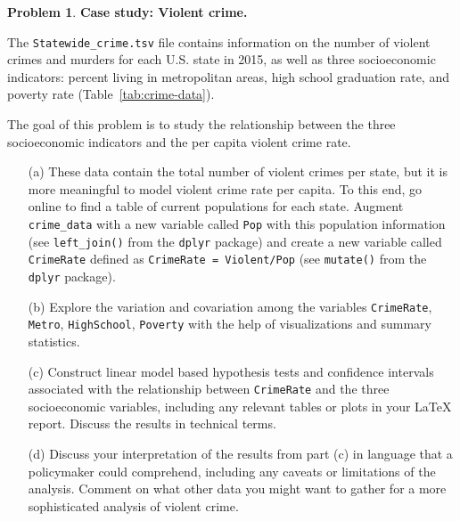 \documentclass[11pt,letterpaper,english,oneside]{article} %
\theoremstyle{definition} %
\newtheorem{problem}{Problem}
\newenvironment{prob}{\clearpage \begin{problem}\hspace{0pt}}{\end{problem}}
\begin{document}
    
    \begin{prob} \label{prob:data}\textbf{Case study: Violent crime.}
    
    \noindent The \texttt{Statewide\_crime.tsv} file contains information on the number of violent crimes and murders for each U.S. state in 2015, as well as three socioeconomic indicators: percent living in metropolitan areas, high school graduation rate, and poverty rate (Table~\ref{tab:crime-data}).

    

    \noindent The goal of this problem is to study the relationship between the three socioeconomic indicators and the per capita violent crime rate.
    
    \begin{itemize}
    \item[(a)] These data contain the total number of violent crimes per state, but it is more meaningful to model violent crime rate per capita. To this end, go online to find a table of current populations for each state. Augment \verb|crime_data| with a new variable called \verb|Pop| with this population information (see \verb|left_join()| from the \verb|dplyr| package) and create a new variable called \verb|CrimeRate| defined as \verb|CrimeRate = Violent/Pop| (see \verb|mutate()| from the \verb|dplyr| package).
    
    \item[(b)] Explore the variation and covariation among the variables \verb|CrimeRate|, \verb|Metro|, \verb|HighSchool|, \verb|Poverty| with the help of visualizations and summary statistics.
    
    \item[(c)] Construct linear model based hypothesis tests and confidence intervals associated with the relationship between \verb|CrimeRate| and the three socioeconomic variables, including any relevant tables or plots in your LaTeX report. Discuss the results in technical terms.
    
    \item[(d)] Discuss your interpretation of the results from part (c) in language that a policymaker could comprehend, including any caveats or limitations of the analysis. Comment on what other data you might want to gather for a more sophisticated analysis of violent crime.
    
    \end{itemize}
    
    \end{prob}
\end{document}
